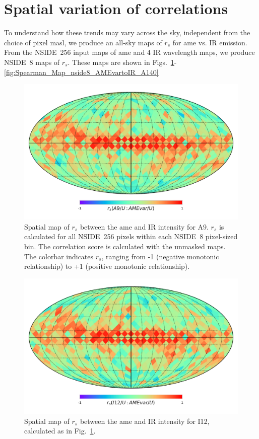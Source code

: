 \section{Spatial variation of correlations}
    To understand how these trends may vary across the sky, independent from the choice of pixel masl, we produce an all-sky maps of $r_{s}$ for \acrshort{ame} vs. IR emission. From the NSIDE~256 input maps of \acrshort{ame} and 4 IR wavelength maps, we produce NSIDE~8 maps of $r_{s}$. These maps are shown in Figs.~\ref{fig:Spearman_Map_nside8_AMEvartoIR_A9}-\ref{fig:Spearman_Map_nside8_AMEvartoIR_A140}
      \begin{figure}
        \includegraphics[width=\textwidth/2]{../Plots/Allsky_Corr/Spearman_Map_nside8_A9toAMEvar.pdf}
        \centering
        \caption{Spatial map of $r_{s}$ between the \acrshort{ame} and IR intensity for A9. $r_{s}$ is calculated for all NSIDE~256 pixels within each NSIDE~8 pixel-sized bin. The correlation score is calculated with the unmasked maps. The colorbar indicates $r_{s}$, ranging from -1 (negative monotonic relationship) to +1 (positive monotonic relationship).}
        \label{fig:Spearman_Map_nside8_AMEvartoIR_A9}
      \end{figure}
      \begin{figure}
        \includegraphics[width=\textwidth/2]{../Plots/Allsky_Corr/Spearman_Map_nside8_I12toAMEvar.pdf}
        \centering
        \caption{Spatial map of $r_{s}$ between the \acrshort{ame} and IR intensity for I12, calculated as in Fig.~\ref{fig:Spearman_Map_nside8_AMEvartoIR_A9}.}
        \label{fig:Spearman_Map_nside8_AMEvartoIR_I12}
      \end{figure}
